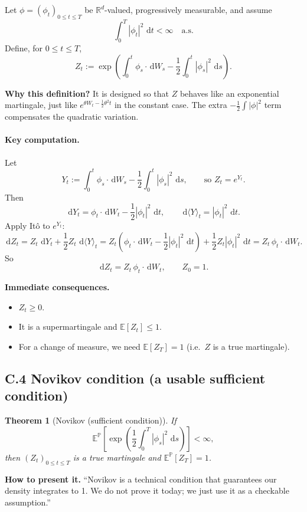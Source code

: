 \documentclass[11pt]{article}
\newcommand{\Pbb}{\mathbb{P}}
\newcommand{\E}{\mathbb{E}}
\newcommand{\R}{\mathbb{R}}
\newcommand{\dd}{\,\mathrm{d}}
\newcommand{\1}{\mathbf{1}}
\newtheorem{theorem}{Theorem}
\begin{document}
Let $\phi=(\phi_t)_{0\le t\le T}$ be $\R^d$-valued, progressively measurable,
and assume
\[
\int_0^T |\phi_t|^2\,\dd t<\infty \quad\text{a.s.}
\]
Define, for $0\le t\le T$,
\[
Z_t
:=
\exp\!\left(
\int_0^t \phi_s\cdot \dd W_s
-
\frac12\int_0^t |\phi_s|^2\,\dd s
\right).
\]


\textbf{Why this definition?}
It is designed so that $Z$ behaves like an exponential martingale,
just like $e^{\theta W_t-\frac12\theta^2 t}$ in the constant case.
The extra $-\frac12\int|\phi|^2$ term compensates the quadratic variation.


\paragraph{Key computation.}
Let
\[
Y_t:=\int_0^t \phi_s\cdot \dd W_s - \frac12\int_0^t |\phi_s|^2\,\dd s,
\qquad\text{so } Z_t=e^{Y_t}.
\]
Then
\[
\dd Y_t = \phi_t\cdot \dd W_t - \frac12|\phi_t|^2\,\dd t,
\qquad
\dd\langle Y\rangle_t = |\phi_t|^2\,\dd t.
\]
Apply It\^o to $e^{Y_t}$:
\[
\dd Z_t
=
Z_t\,\dd Y_t + \frac12 Z_t\,\dd\langle Y\rangle_t
=
Z_t\left(\phi_t\cdot \dd W_t - \frac12|\phi_t|^2\,\dd t\right)
+\frac12 Z_t |\phi_t|^2\,\dd t
=
Z_t\,\phi_t\cdot \dd W_t.
\]
So
\[
\boxed{\ \dd Z_t = Z_t\,\phi_t\cdot \dd W_t,\qquad Z_0=1. \ }
\]


\textbf{Immediate consequences.}
\begin{itemize}[leftmargin=1.4em]
\item $Z_t\ge 0$.
\item It is a supermartingale and 
$\E[Z_t]\le 1$.
\item For a change of measure, we need $\E[Z_T]=1$
(i.e.\ $Z$ is a true martingale).
\end{itemize}


\subsection*{C.4 Novikov condition (a usable sufficient condition)}

\begin{theorem}[Novikov (sufficient condition)]
If
\[
\E^{\Pbb}\!\left[
\exp\!\left(\frac12\int_0^T |\phi_s|^2\,\dd s\right)
\right]<\infty,
\]
then $(Z_t)_{0\le t\le T}$ is a true martingale and $\E^{\Pbb}[Z_T]=1$.
\end{theorem}


\textbf{How to present it.}
``Novikov is a technical condition that guarantees our density integrates to 1.
We do not prove it today; we just use it as a checkable assumption.''
\end{document}

